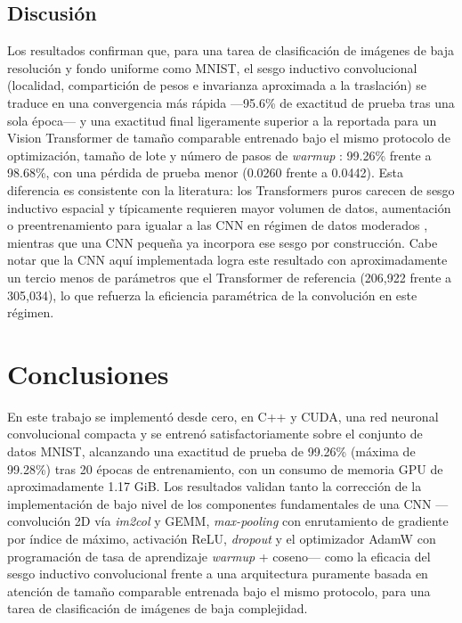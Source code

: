 \documentclass[conference]{IEEEtran}
\begin{document}
\subsection{Discusión}
Los resultados confirman que, para una tarea de clasificación de imágenes de baja resolución y fondo uniforme como MNIST, el sesgo inductivo convolucional (localidad, compartición de pesos e invarianza aproximada a la traslación) se traduce en una convergencia más rápida —95.6\% de exactitud de prueba tras una sola época— y una exactitud final ligeramente superior a la reportada para un Vision Transformer de tamaño comparable entrenado bajo el mismo protocolo de optimización, tamaño de lote y número de pasos de \emph{warmup} \cite{dosovitskiy2020image}: 99.26\% frente a 98.68\%, con una pérdida de prueba menor (0.0260 frente a 0.0442). Esta diferencia es consistente con la literatura: los Transformers puros carecen de sesgo inductivo espacial y típicamente requieren mayor volumen de datos, aumentación o preentrenamiento para igualar a las CNN en régimen de datos moderados \cite{dosovitskiy2020image}, mientras que una CNN pequeña ya incorpora ese sesgo por construcción. Cabe notar que la CNN aquí implementada logra este resultado con aproximadamente un tercio menos de parámetros que el Transformer de referencia (206{,}922 frente a 305{,}034), lo que refuerza la eficiencia paramétrica de la convolución en este régimen.

\section{Conclusiones}

En este trabajo se implementó desde cero, en C++ y CUDA, una red neuronal convolucional compacta y se entrenó satisfactoriamente sobre el conjunto de datos MNIST, alcanzando una exactitud de prueba de 99.26\% (máxima de 99.28\%) tras 20 épocas de entrenamiento, con un consumo de memoria GPU de aproximadamente 1.17 GiB. Los resultados validan tanto la corrección de la implementación de bajo nivel de los componentes fundamentales de una CNN —convolución 2D vía \emph{im2col} y GEMM, \emph{max-pooling} con enrutamiento de gradiente por índice de máximo, activación ReLU, \emph{dropout} y el optimizador AdamW con programación de tasa de aprendizaje \emph{warmup} + coseno— como la eficacia del sesgo inductivo convolucional frente a una arquitectura puramente basada en atención de tamaño comparable entrenada bajo el mismo protocolo, para una tarea de clasificación de imágenes de baja complejidad.
\end{document}
